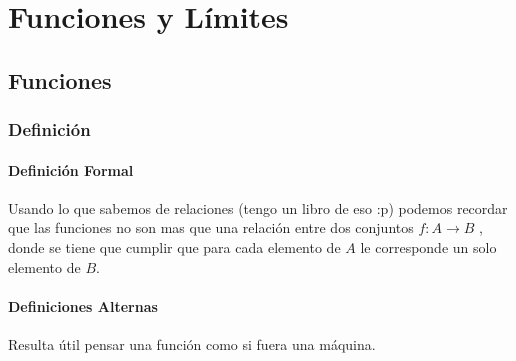 \documentclass[12pt, fleqn]{report}                             %
\theoremstyle{break}                                            %
\begin{document}
           
            




\part{Funciones y Límites}

    \chapter{Funciones}
        \clearpage

        \section{Definición}

            \subsection*{Definición Formal}
                Usando lo que sabemos de relaciones (tengo un libro de eso :p) podemos recordar
                que las funciones no son mas que una relación entre dos conjuntos $f : A \to B$
                , donde se tiene que cumplir que para cada elemento de $A$ le corresponde un
                solo elemento de $B$.


            \subsection*{Definiciones Alternas}
            Resulta útil pensar una función como si fuera una máquina.
\end{document}
